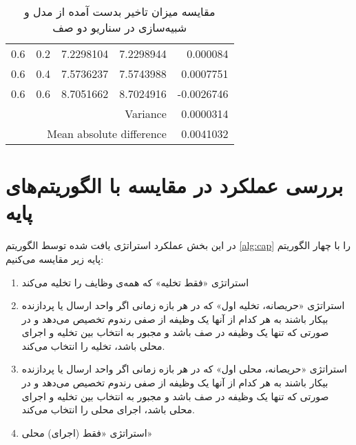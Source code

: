 \begin{table}[]
\begin{latin}
\begin{tabular}{@{}rrrrr@{}}
			0.6                      & 0.2                      & 7.2298104                                  & 7.2298944                                     & 0.000084                  \\
			0.6                      & 0.4                      & 7.5736237                                  & 7.5743988                                     & 0.0007751                 \\
			0.6                      & 0.6                      & 8.7051662                                  & 8.7024916                                     & -0.0026746                \\ \midrule
			\multicolumn{4}{r}{Variance}                                                                                                                     & 0.0000314                 \\
			\multicolumn{4}{r}{Mean absolute difference}                                                                                                     & 0.0041032                 \\ \bottomrule
		\end{tabular}
	\end{latin}
	\caption{مقایسه میزان تاخیر بدست آمده از مدل و شبیه‌سازی در سناریو دو صف}
	\label{table:scenario2}
\end{table}
\section{بررسی عملکرد در مقایسه با الگوریتم‌های پایه}
در این بخش عملکرد استراتژی یافت شده توسط الگوریتم \ref{alg:cap} را با چهار الگوریتم پایه زیر مقایسه می‌کنیم:
\begin{enumerate}
	\item استراتژی «فقط تخلیه» که همه‌ی وظایف را تخلیه می‌کند
	\item استراتژی «حریصانه، تخلیه اول» که در هر بازه زمانی اگر واحد ارسال یا پردازنده بیکار باشند به هر کدام از آنها یک وظیفه از صفی رندوم تخصیص می‌دهد و در صورتی که تنها یک وظیفه در صف باشد و مجبور به انتخاب بین تخلیه و اجرای محلی باشد، تخلیه را انتخاب می‌کند.
	\item استراتژی «حریصانه، محلی اول» که در هر بازه زمانی اگر واحد ارسال یا پردازنده بیکار باشند به هر کدام از آنها یک وظیفه از صفی رندوم تخصیص می‌دهد و در صورتی که تنها یک وظیفه در صف باشد و مجبور به انتخاب بین تخلیه و اجرای محلی باشد، اجرای محلی را انتخاب می‌کند.
	\item استراتژی «فقط (اجرای) محلی»
\end{enumerate}
